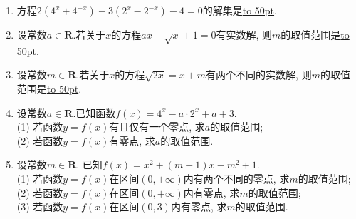 \documentclass[10pt,a4paper]{article}
\newcommand{\blank}[1]{\underline{\hbox to #1pt{}}}
\begin{document}
\begin{enumerate}[1.]
\item 方程$2(4^x+4^{-x})-3(2^x-2^{-x})-4=0$的解集是\blank{50}.
\item 设常数$a\in \mathbf{R}$.若关于$x$的方程$ax-\sqrt x+1=0$有实数解, 则$m$的取值范围是\blank{50}.
\item 设常数$m\in \mathbf{R}$.若关于$x$的方程$\sqrt{2x}=x+m$有两个不同的实数解, 则$m$的取值范围是\blank{50}.
\item 设常数$a\in \mathbf{R}$.已知函数$f(x)=4^x-a\cdot 2^x+a+3$.\\
(1) 若函数$y=f(x)$有且仅有一个零点, 求$a$的取值范围;\\
(2) 若函数$y=f(x)$有零点, 求$a$的取值范围.
\item 设常数$m\in \mathbf{R}$. 已知$f(x)=x^2+(m-1)x-m^2+1$.\\
(1) 若函数$y=f(x)$在区间$(0,+\infty)$内有两个不同的零点, 求$m$的取值范围;\\
(2) 若函数$y=f(x)$在区间$(0,+\infty)$内有零点, 求$m$的取值范围;\\
(3) 若函数$y=f(x)$在区间$(0,3)$内有零点, 求$m$的取值范围.


\end{enumerate}
\end{document}
